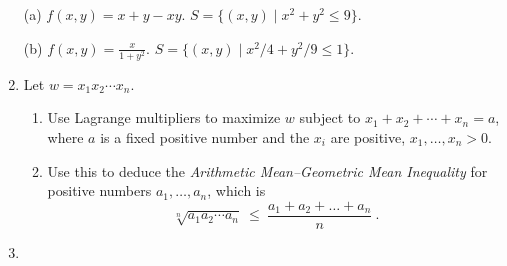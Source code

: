 \documentclass[12pt]{article}
\begin{document}
\begin{enumerate}
  (a) $f(x,y)=x+y-xy$.
  \qquad  $S=\{(x,y)\mid x^2+y^2\leq 9\}$.


  (b) $f(x,y)=\frac{x}{1+y^2}$.
      \qquad $S=\{ (x,y) \mid x^2/4 + y^2/9 \leq 1\}$.
\vspace{-2pt}


\item  Let $w=x_1x_2\dotsb x_n$.
  \begin{enumerate}
  \item Use Lagrange multipliers to maximize $w$ subject to $x_1+x_2+\dotsb+x_n=a$, where $a$ is a fixed positive number and the $x_i$ are
    positive, $x_1,\dotsc,x_n>0$.

  \item Use this to deduce the {\sl\color{Blue}Arithmetic Mean--Geometric Mean Inequality} for positive numbers $a_1,\dotsc,a_n$, which is
    \[
    \sqrt[n]{a_1 a_2 \dotsb a_n}\ \leq\ \frac{a_1+a_2+ \dotsc+a_n}{n}\ .
    \]
  \end{enumerate}
\vspace{-2pt}

\item 
\vspace{-2pt}

\end{enumerate}
\end{document}
